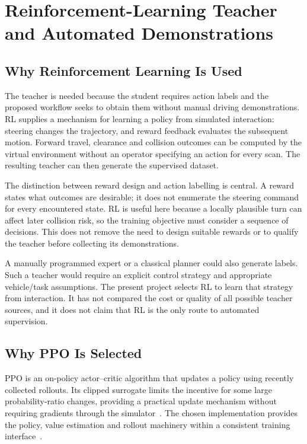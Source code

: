 \chapter{Reinforcement-Learning Teacher and Automated Demonstrations}
\label{ch:teacher}
\section{Why Reinforcement Learning Is Used}
The teacher is needed because the student requires action labels and the
proposed workflow seeks to obtain them without manual driving demonstrations.
RL supplies a mechanism for learning a policy from simulated interaction:
steering changes the trajectory, and reward feedback evaluates the subsequent
motion. Forward travel, clearance and collision outcomes can be computed by
the virtual environment without an operator specifying an action for every
scan. The resulting teacher can then generate the supervised dataset.

The distinction between reward design and action labelling is central. A reward
states what outcomes are desirable; it does not enumerate the steering command
for every encountered state. RL is useful here because a locally plausible turn
can affect later collision risk, so the training objective must consider a
sequence of decisions. This does not remove the need to design suitable rewards
or to qualify the teacher before collecting its demonstrations.

A manually programmed expert or a classical planner could also generate labels.
Such a teacher would require an explicit control strategy and appropriate
vehicle/task assumptions. The present project selects RL to learn that strategy
from interaction. It has not compared the cost or quality of all possible
teacher sources, and it does not claim that RL is the only route to automated
supervision.

\section{Why PPO Is Selected}
PPO is an on-policy actor--critic algorithm that updates a policy using recently
collected rollouts. Its clipped surrogate limits the incentive for some large
probability-ratio changes, providing a practical update mechanism without
requiring gradients through the simulator~\cite{schulman2017ppo}. The chosen
implementation provides the policy, value estimation and rollout machinery
within a consistent training interface~\cite{raffin2021sb3}.

